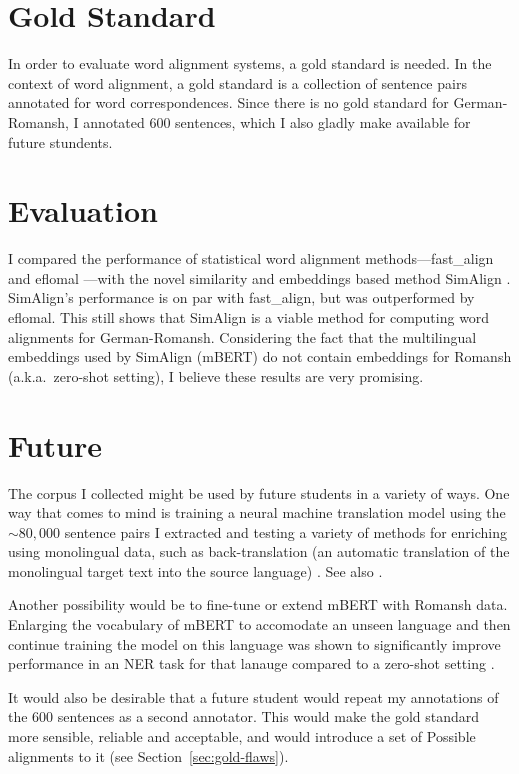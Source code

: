 \section{Gold Standard}
In order to evaluate word alignment systems, a gold standard is needed. 
In the context of word alignment, a gold standard is a collection of sentence pairs annotated for word correspondences. 
Since there is no gold standard for German-Romansh, I annotated 600 sentences, which I also gladly make available for future stundents. 

\section{Evaluation}
I compared the performance of statistical word alignment methods---fast\_align \autocite{dyer-etal-2013-simple} and eflomal \autocite{Ostling2016efmaral}---with the novel similarity and embeddings based method SimAlign \autocite{jalili-sabet-etal-2020-simalign}. 
SimAlign's performance is on par with fast\_align, but was outperformed by eflomal. 
This still shows that SimAlign is a viable method for computing word alignments for German-Romansh. 
Considering the fact that the multilingual embeddings used by SimAlign (mBERT) do not contain embeddings for Romansh (a.k.a.~zero-shot setting), I believe these results are very promising.

\section{Future}
The corpus I collected might be used by future students in a variety of ways. 
One way that comes to mind is training a neural machine translation model using the $\sim80,000$ sentence pairs I extracted and testing a variety of methods for enriching using monolingual data, such as back-translation (an automatic translation of the monolingual target text into the source language) \autocite{sennrich-etal-2016-improving}. 
See also \cite{https://doi.org/10.48550/arxiv.2107.04239}.

Another possibility would be to fine-tune or extend mBERT with Romansh data. 
Enlarging the vocabulary of mBERT to accomodate an unseen language and then continue training the model on this language was shown to significantly improve performance in an NER task for that lanauge compared to a zero-shot setting \autocite{wang-etal-2020-extending}. 

It would also be desirable that a future student would repeat my annotations of the 600 sentences as a second annotator. 
This would make the gold standard more sensible, reliable and acceptable, and would introduce a set of Possible alignments to it (see Section~\ref{sec:gold-flaws}).




